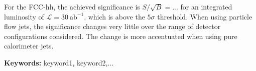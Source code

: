 For the FCC-hh, the achieved significance is $S/\sqrt{B}=...$ for an integrated luminosity of $\mathcal{L}=30~\text{ab}^{-1}$, which is above the $5\sigma$ threshold. When using particle flow jets, the significance changes very little over the range of detector configurations considered. The change is more accentuated when using pure calorimeter jets.

\vfill

\textbf{\Large Keywords:} keyword1, keyword2,...

